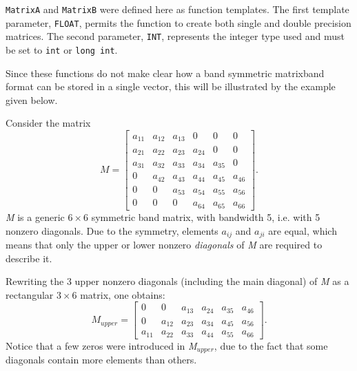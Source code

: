 \texttt{MatrixA} and \texttt{MatrixB} were defined here as function templates. The first template parameter, \texttt{FLOAT}, permits the function to create both single and double precision matrices. The second parameter, \texttt{INT}, represents the integer type used and must be set to \texttt{int} or \texttt{long int}. 

Since these functions do not make clear how a band symmetric matrixband format can be stored in a single vector, this will be illustrated by the example given below. 

Consider the matrix
\[M=\left[\begin{array}{cccccc} {a_{11} } & {a_{12} } & {a_{13} } & {0} & {0} & {0} \\ {a_{21} } & {a_{22} } & {a_{23} } & {a_{24} } & {0} & {0} \\ {a_{31} } & {a_{32} } & {a_{33} } & {a_{34} } & {a_{35} } & {0} \\ {0} & {a_{42} } & {a_{43} } & {a_{44} } & {a_{45} } & {a_{46} } \\ {0} & {0} & {a_{53} } & {a_{54} } & {a_{55} } & {a_{56} } \\ {0} & {0} & {0} & {a_{64} } & {a_{65} } & {a_{66} } \end{array}\right].\]
\textit{M} is a generic $6\times 6$ symmetric band matrix, with bandwidth 5, i.e. with 5 nonzero diagonals. Due to the symmetry, elements $a_{ij}$ and $a_{ji}$ are equal, which means that only the upper or lower nonzero \textit{diagonals} of \textit{M} are required to describe it.

Rewriting the 3 upper nonzero diagonals (including the main diagonal) of \textit{M} as a rectangular $3\times 6$ matrix, one obtains:
\[M_{upper} =\left[\begin{array}{cccccc} {0} & {0} & {a_{13} } & {a_{24} } & {a_{35} } & {a_{46} } \\ {0} & {a_{12} } & {a_{23} } & {a_{34} } & {a_{45} } & {a_{56} } \\ {a_{11} } & {a_{22} } & {a_{33} } & {a_{44} } & {a_{55} } & {a_{66} } \end{array}\right].\]
Notice that a few zeros were introduced in \textit{M${}_{upper}$}, due to the fact that some diagonals contain more elements than others.

